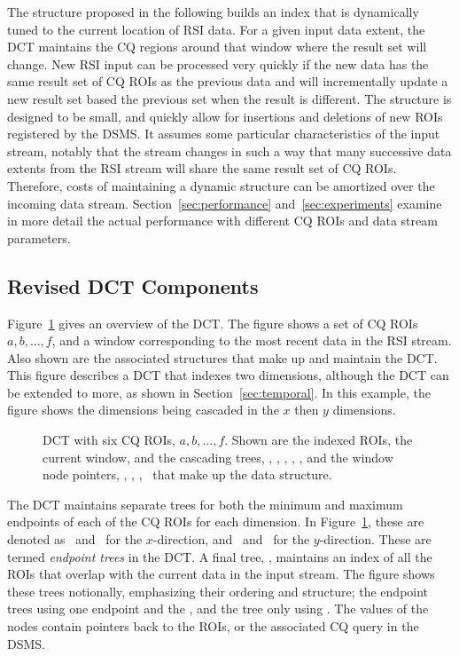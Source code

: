 \documentclass{ucdthesis}       %
\begin{document}
The structure proposed in the following builds an index that is
dynamically tuned to the current location of \ac{RSI} data.  For a
given input data extent, the \ac{DCT} maintains the \ac{CQ} regions
around that window where the result set will change.  New \ac{RSI}
input can be processed very quickly if the new data has the same
result set of \ac{CQ} \acp{ROI} as the previous data and will
incrementally update a new result set based the previous set when the
result is different.  The structure is designed to be small, and
quickly allow for insertions and deletions of new \acp{ROI} registered
by the \ac{DSMS}.  It assumes some particular characteristics of the
input stream, notably that the stream changes in such a way that many
successive data extents from the \acs{RSI} stream will share the same
result set of \ac{CQ} \acp{ROI}.  Therefore, costs of maintaining a
dynamic structure can be amortized over the incoming data stream.
Section~\ref{sec:performance} and~\ref{sec:experiments} examine in
more detail the actual performance with different \ac{CQ} \acp{ROI} and
data stream parameters.

\subsection{Revised \ac{DCT} Components}

Figure~\ref{fig:dct} gives an overview of the \ac{DCT}.  The figure
shows a set of \ac{CQ} \acp{ROI} $a, b, \ldots, f$, and a window
corresponding to the most recent data in the \ac{RSI} stream.  Also
shown are the associated structures that make up and maintain the
\ac{DCT}.  This figure describes a \ac{DCT} that indexes two
dimensions, although the \ac{DCT} can be extended to more, as shown in
Section~\ref{sec:temporal}.  In this example, the figure shows the
dimensions being cascaded in the $x$ then $y$ dimensions.

\begin{figure}[htb]
  \centering
  \scalebox{0.9}{}
  \caption[\acf{DCT} with windows]{%
    \acf{DCT} with six CQ \acp{ROI}, $a, b, \ldots, f$.  Shown are the
    indexed \acp{ROI}, the current window, and the cascading trees,
    \Xn, \Xx, \Yn, \Yx, , and the window node pointers, \wxn,
    \wxx, \wyn, \wyx\ that make up the data structure.}
  \label{fig:dct}
\end{figure}

The \ac{DCT} maintains separate trees for both the minimum and maximum
endpoints of each of the \ac{CQ} \acp{ROI} for each dimension.  In
Figure~\ref{fig:dct}, these are denoted as \Xn\ and \Xx\ for the
$x$-direction, and \Yn\ and \Yx\ for the $y$-direction.  These are
termed \emph{endpoint trees} in the \ac{DCT}.  A final tree, , maintains
an index of all the \acp{ROI} that overlap with the current data
in the input stream.  The figure shows these trees notionally,
emphasizing their ordering and structure; the endpoint trees using one
endpoint and the \rid, and the  tree only using \rid.  The values
of the nodes contain pointers back to the \acp{ROI}, or the
associated \ac{CQ} query in the \ac{DSMS}.
\end{document}
